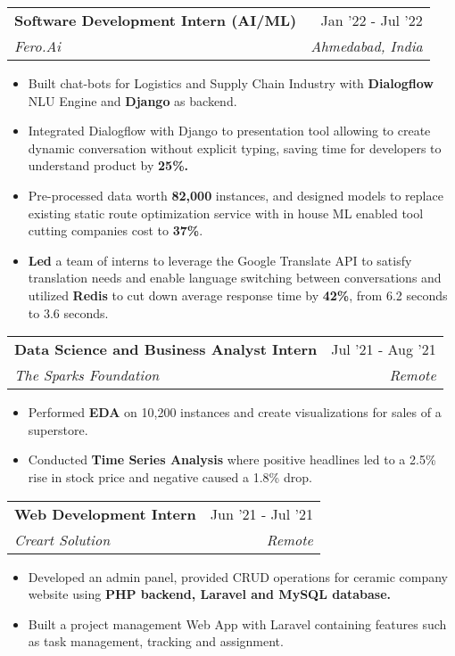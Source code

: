 \documentclass[a4paper,20pt]{article}
\makeatletter
\newcommand{\resumeItem}[2]{
	\item\small{
		\textbf{#1}{#2 \vspace{-2pt}}
	}
}
\newcommand{\resumeSubheading}[4]{
	\vspace{-1pt}\item
	\begin{tabular*}{0.97\textwidth}{l@{\extracolsep{\fill}}r}
		\textbf{#1} & #2 \\
		\textit{#3} & \textit{#4} \\
	\end{tabular*}\vspace{-5pt}
}
\newcommand{\resumeItemListStart}{\begin{itemize}}
\newcommand{\resumeItemListEnd}{\end{itemize}\vspace{-5pt}}
\makeatother
\begin{document}
{                 \resumeSubheading
                    {Software Development Intern (AI/ML)}{Jan '22 - Jul '22}
                    {Fero.Ai}{Ahmedabad, India}	
                    \resumeItemListStart
                        \resumeItem {}{Built chat-bots for Logistics and Supply Chain Industry with \textbf{Dialogflow} NLU Engine and \textbf{Django} as backend.}
                        \resumeItem{}{Integrated Dialogflow with Django to presentation tool allowing to create dynamic conversation without explicit typing, saving time for developers to understand product by \textbf{25\%.}}
                        \resumeItem{}{Pre-processed data worth \textbf{82,000} instances, and designed models to replace existing static route optimization service with in house ML enabled tool cutting companies cost to \textbf{37\%}.}
                         \resumeItem{}{\textbf{Led} a team of interns to leverage the Google Translate API to satisfy translation needs and enable language switching between conversations and utilized \textbf{Redis} to cut down average response time by \textbf{42\%}, from 6.2 seconds to 3.6 seconds.}
                	\resumeItemListEnd
                 
                \resumeSubheading
                    {Data Science and Business Analyst Intern}{Jul '21 -  Aug '21}
                    {The Sparks Foundation}{Remote}
                    \resumeItemListStart
                        \resumeItem{}{Performed \textbf{EDA} on 10,200 instances and create visualizations for sales of a superstore.}
                        \resumeItem{}{Conducted \textbf{Time Series Analysis} where positive headlines led to a 2.5\% rise in stock price and negative caused a 1.8\% drop.}
                	\resumeItemListEnd
                 
                \resumeSubheading
                    {Web Development Intern}{Jun '21 - Jul '21}
                    {Creart Solution}{Remote}
                    \resumeItemListStart
                        \resumeItem{}{Developed an admin panel, provided CRUD operations for ceramic company website using \textbf{PHP backend, Laravel and MySQL database.}}
                        \resumeItem{}{Built a project management Web App with Laravel containing features such as task management, tracking and assignment.}
                    \resumeItemListEnd
                 
}
\end{document}
